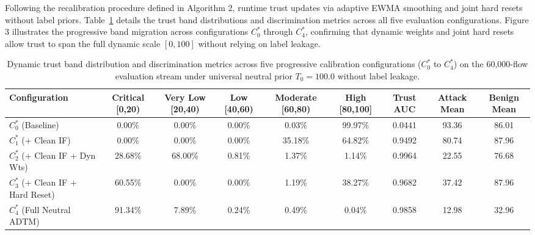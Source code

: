 \documentclass[journal,10pt,onecolumn]{IEEEtran}
\begin{document}
Following the recalibration procedure defined in Algorithm 2, runtime trust updates via adaptive EWMA smoothing and joint hard resets without label priors. Table~\ref{tab:trust_neutral} details the trust band distributions and discrimination metrics across all five evaluation configurations. Figure 3 illustrates the progressive band migration across configurations $C_0^*$ through $C_4^*$, confirming that dynamic weights and joint hard resets allow trust to span the full dynamic scale $[0, 100]$ without relying on label leakage.

\begin{table}[t]
\caption{Dynamic trust band distribution and discrimination metrics across five progressive calibration configurations ($C_0^*$ to $C_4^*$) on the 60,000-flow evaluation stream under universal neutral prior $T_0 = 100.0$ without label leakage.}
\label{tab:trust_neutral}
\centering
\small
\begin{tabular}{lcccccccc}
\toprule
\textbf{Configuration} & \textbf{Critical [0,20)} & \textbf{Very Low [20,40)} & \textbf{Low [40,60)} & \textbf{Moderate [60,80)} & \textbf{High [80,100]} & \textbf{Trust AUC} & \textbf{Attack Mean} & \textbf{Benign Mean} \\
\midrule
$C_0^*$ (Baseline) & 0.00\% & 0.00\% & 0.00\% & 0.03\% & 99.97\% & 0.0441 & 93.36 & 86.01 \\
$C_1^*$ (+ Clean IF) & 0.00\% & 0.00\% & 0.00\% & 35.18\% & 64.82\% & 0.9492 & 80.74 & 87.96 \\
$C_2^*$ (+ Clean IF + Dyn Wts) & 28.68\% & 68.00\% & 0.81\% & 1.37\% & 1.14\% & 0.9964 & 22.55 & 76.68 \\
$C_3^*$ (+ Clean IF + Hard Reset) & 60.55\% & 0.00\% & 0.00\% & 1.19\% & 38.27\% & 0.9682 & 37.42 & 87.96 \\
$C_4^*$ (Full Neutral ADTM) & 91.34\% & 7.89\% & 0.24\% & 0.49\% & 0.04\% & 0.9858 & 12.98 & 32.96 \\
\bottomrule
\end{tabular}
\end{table}
\end{document}
